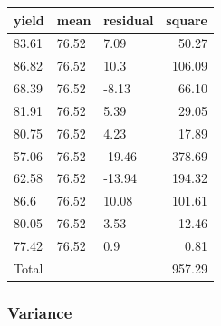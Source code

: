\documentclass[
]{book}
\newenvironment{Shaded}{\begin{snugshade}}{\end{snugshade}}
\newcommand{\AttributeTok}[1]{\textcolor[rgb]{0.77,0.63,0.00}{#1}}
\newcommand{\DecValTok}[1]{\textcolor[rgb]{0.00,0.00,0.81}{#1}}
\newcommand{\FunctionTok}[1]{\textcolor[rgb]{0.00,0.00,0.00}{#1}}
\newcommand{\NormalTok}[1]{#1}
\newcommand{\OtherTok}[1]{\textcolor[rgb]{0.56,0.35,0.01}{#1}}
\newcommand{\SpecialCharTok}[1]{\textcolor[rgb]{0.00,0.00,0.00}{#1}}
\newcommand{\StringTok}[1]{\textcolor[rgb]{0.31,0.60,0.02}{#1}}
\begin{document}
\begin{Shaded}
\end{Shaded}

\begin{tabular}[t]{l|l|l|r}
\hline
yield & mean & residual & square\\
\hline
83.61 & 76.52 & 7.09 & 50.27\\
\hline
86.82 & 76.52 & 10.3 & 106.09\\
\hline
68.39 & 76.52 & -8.13 & 66.10\\
\hline
81.91 & 76.52 & 5.39 & 29.05\\
\hline
80.75 & 76.52 & 4.23 & 17.89\\
\hline
57.06 & 76.52 & -19.46 & 378.69\\
\hline
62.58 & 76.52 & -13.94 & 194.32\\
\hline
86.6 & 76.52 & 10.08 & 101.61\\
\hline
80.05 & 76.52 & 3.53 & 12.46\\
\hline
77.42 & 76.52 & 0.9 & 0.81\\
\hline
Total &  &  & 957.29\\
\hline
\end{tabular}

\hypertarget{variance}{%
\subsubsection{Variance}\label{variance}}
\end{document}
